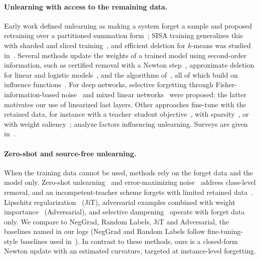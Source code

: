 \documentclass[10pt,twocolumn,letterpaper]{article}
\begin{document}
\paragraph{Unlearning with access to the remaining data.}
Early work defined unlearning as making a system forget a sample and proposed retraining over a partitioned summation form~\cite{cao2015towards}; SISA training generalizes this with sharded and sliced training~\cite{bourtoule2021machine}, and efficient deletion for $k$-means was studied in~\cite{ginart2019making}.
Several methods update the weights of a trained model using second-order information, such as certified removal with a Newton step~\cite{guo2020certified}, approximate deletion for linear and logistic models~\cite{izzo2021approximate}, and the algorithms of~\cite{sekhari2021remember}, all of which build on influence functions~\cite{koh2017understanding}.
For deep networks, selective forgetting through Fisher-information-based noise~\cite{golatkar2020eternal,golatkar2020forgetting} and mixed linear networks~\cite{golatkar2021mixed} were proposed; the latter motivates our use of linearized last layers.
Other approaches fine-tune with the retained data, for instance with a teacher--student objective~\cite{kurmanji2023towards}, with sparsity~\cite{jia2023model}, or with weight saliency~\cite{fan2024salun}; \cite{thudi2022unrolling} analyze factors influencing unlearning.
Surveys are given in~\cite{xu2023machine}.

\paragraph{Zero-shot and source-free unlearning.}
When the training data cannot be used, methods rely on the forget data and the model only.
Zero-shot unlearning~\cite{chundawat2023zero} and error-maximizing noise~\cite{tarun2023fast} address class-level removal, and an incompetent-teacher scheme forgets with limited retained data~\cite{chundawat2023can}.
Lipschitz regularization~\cite{foster2024zero} (JiT), adversarial examples combined with weight importance~\cite{cha2024learning} (Adversarial), and selective dampening~\cite{foster2024fast} operate with forget data only.
We compare to NegGrad, Random Labels, JiT and Adversarial, the baselines named in our logs (NegGrad and Random Labels follow fine-tuning-style baselines used in~\cite{golatkar2020eternal,graves2021amnesiac,kurmanji2023towards}).
In contrast to these methods, ours is a closed-form Newton update with an estimated curvature, targeted at instance-level forgetting.
\end{document}
